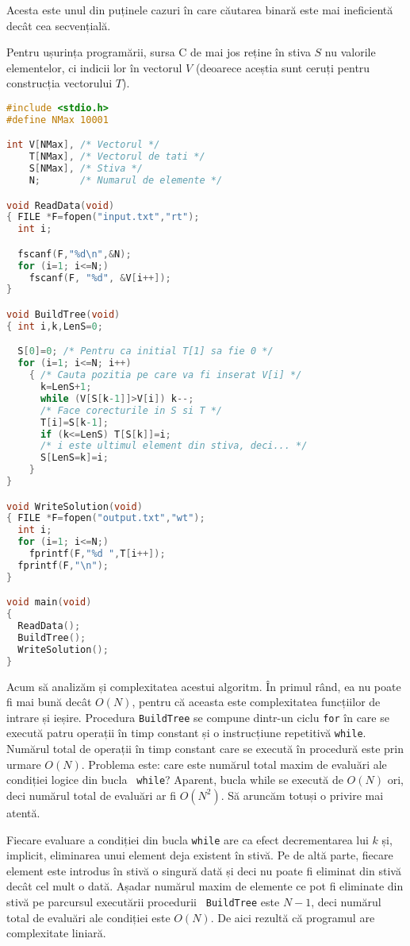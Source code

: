 Acesta este unul din puținele cazuri în care căutarea binară este mai
ineficientă decât cea secvențială.

Pentru ușurința programării, sursa C de mai jos reține în stiva $S$ nu
valorile elementelor, ci indicii lor în vectorul $V$ (deoarece aceștia sunt
ceruți pentru construcția vectorului $T$).

\begin{lstlisting}[language=C]
#include <stdio.h>
#define NMax 10001

int V[NMax], /* Vectorul */
    T[NMax], /* Vectorul de tati */
    S[NMax], /* Stiva */
    N;       /* Numarul de elemente */

void ReadData(void)
{ FILE *F=fopen("input.txt","rt");
  int i;

  fscanf(F,"%d\n",&N);
  for (i=1; i<=N;)
    fscanf(F, "%d", &V[i++]);
}

void BuildTree(void)
{ int i,k,LenS=0;

  S[0]=0; /* Pentru ca initial T[1] sa fie 0 */
  for (i=1; i<=N; i++)
    { /* Cauta pozitia pe care va fi inserat V[i] */
      k=LenS+1;
      while (V[S[k-1]]>V[i]) k--;
      /* Face corecturile in S si T */
      T[i]=S[k-1];
      if (k<=LenS) T[S[k]]=i;
      /* i este ultimul element din stiva, deci... */
      S[LenS=k]=i;
    }
}

void WriteSolution(void)
{ FILE *F=fopen("output.txt","wt");
  int i;
  for (i=1; i<=N;)
    fprintf(F,"%d ",T[i++]);
  fprintf(F,"\n");
}

void main(void)
{
  ReadData();
  BuildTree();
  WriteSolution();
}
\end{lstlisting}

Acum să analizăm și complexitatea acestui algoritm. În primul rând, ea nu
poate fi mai bună decât $O(N)$, pentru că aceasta este complexitatea
funcțiilor de intrare și ieșire. Procedura {\tt BuildTree} se compune dintr-un
ciclu {\tt for} în care se execută patru operații în timp constant și o
instrucțiune repetitivă {\tt while}. Numărul total de operații în timp
constant care se execută în procedură este prin urmare $O(N)$. Problema este:
care este numărul total maxim de evaluări ale condiției logice din bucla {\tt
  while}? Aparent, bucla while se execută de $O(N)$ ori, deci numărul total de
evaluări ar fi $O(N^2)$. Să aruncăm totuși o privire mai atentă.

Fiecare evaluare a condiției din bucla {\tt while} are ca efect decrementarea
lui $k$ și, implicit, eliminarea unui element deja existent în stivă. Pe de
altă parte, fiecare element este introdus în stivă o singură dată și deci nu
poate fi eliminat din stivă decât cel mult o dată. Așadar numărul maxim de
elemente ce pot fi eliminate din stivă pe parcursul executării procedurii {\tt
  BuildTree} este $N-1$, deci numărul total de evaluări ale condiției este
$O(N)$. De aici rezultă că programul are complexitate liniară.
